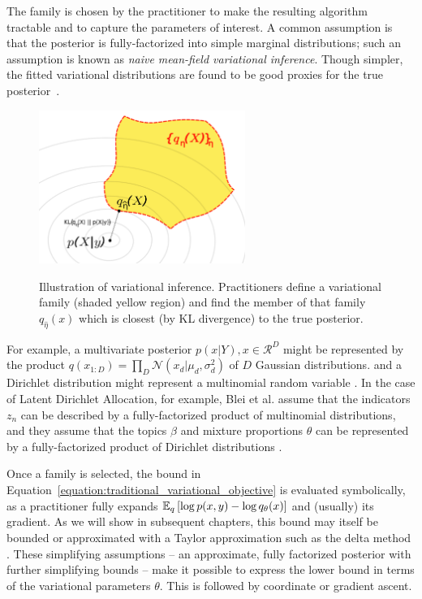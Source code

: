 The family is chosen by the practitioner to make the resulting
algorithm tractable and to capture the parameters of interest. A
common assumption is that the posterior is fully-factorized into
simple marginal distributions; such an assumption is known as
\emph{naive mean-field variational inference}. Though simpler, the
fitted variational distributions are found to be good proxies for the
true posterior~\cite{jordan:1999,gerrish:2011}.

\begin{figure}
  \center
  \includegraphics[width=0.6\textwidth]{chapter_introductory_material/figs/variational_family.pdf}
  \label{figure:variational_inference}
  \caption{Illustration of variational inference.  Practitioners
    define a variational family (shaded yellow region) and find the
    member of that family $q_{\hat \eta}(x)$ which is closest (by KL
    divergence) to the true posterior.}
\end{figure}
For example, a multivariate posterior $p(x | Y), x \in \mathcal{R}^D$
might be represented by the product $q(x_{1:D}) = \prod_D \mathcal{N}(x_d | \mu_d,
\sigma_d^2)$ of $D$ Gaussian distributions. and a Dirichlet
distribution might represent a multinomial random variable
\cite{bishop:2006}.  In the case of Latent Dirichlet Allocation, for
example, Blei et al. assume that the indicators $z_n$ can be
described by a fully-factorized product of multinomial distributions,
and they assume that the topics $\beta$ and mixture proportions
$\theta$ can be represented by a fully-factorized product of Dirichlet
distributions \cite{blei:2003}.

Once a family is selected, the bound in
Equation~\ref{equation:traditional_variational_objective} is evaluated
symbolically, as a practitioner fully expands $\mathbb{E}_q\left[ \log p(x, y)
  - \log q_\theta(x)\right]$ and (usually) its gradient. As we will show in
subsequent chapters, this bound may itself be bounded or approximated
with a Taylor approximation such as the delta method
\cite{bickel:2007,braun:2007}. These simplifying assumptions -- an
approximate, fully factorized posterior with further simplifying
bounds -- make it possible to express the lower bound in terms of the
variational parameters $\theta$.  This is followed by coordinate or
gradient ascent.

